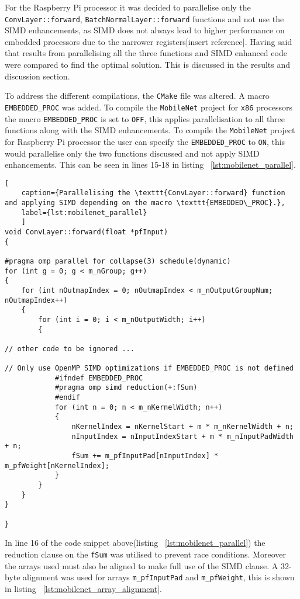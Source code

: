 For the Raspberry Pi processor it was decided to parallelise only the \texttt{ConvLayer::forward}, \texttt{BatchNormalLayer::forward} functions and not use the SIMD enhancements, as SIMD does not always lead to higher performance on embedded processors due to the narrower registers[insert reference]. Having said that results from parallelising all the three functions and SIMD enhanced code were compared to find the optimal solution. This is discussed in the results and discussion section. 

To address the different compilations, the \texttt{CMake} file was altered. A macro \texttt{EMBEDDED\_PROC} was added. To compile the \texttt{MobileNet} project for \texttt{x86} processors the macro \texttt{EMBEDDED\_PROC} is set to \texttt{OFF}, this applies parallelisation to all three functions along with the SIMD enhancements. To compile the \texttt{MobileNet} project for Raspberry Pi processor the user can specify the \texttt{EMBEDDED\_PROC} to \texttt{ON}, this would parallelise only the two functions discussed and not apply SIMD enhancements. This can be seen in lines 15-18 in listing ~\ref{lst:mobilenet_parallel}.

\begin{lstlisting}[
	caption={Parallelising the \texttt{ConvLayer::forward} function and applying SIMD depending on the macro \texttt{EMBEDDED\_PROC}.},
	label={lst:mobilenet_parallel}
	]
void ConvLayer::forward(float *pfInput)
{

#pragma omp parallel for collapse(3) schedule(dynamic)
for (int g = 0; g < m_nGroup; g++)
{
	for (int nOutmapIndex = 0; nOutmapIndex < m_nOutputGroupNum; nOutmapIndex++)
	{
		for (int i = 0; i < m_nOutputWidth; i++)
		{
			
// other code to be ignored ... 
			
// Only use OpenMP SIMD optimizations if EMBEDDED_PROC is not defined 
			#ifndef EMBEDDED_PROC
			#pragma omp simd reduction(+:fSum)
			#endif
			for (int n = 0; n < m_nKernelWidth; n++)
			{
				nKernelIndex = nKernelStart + m * m_nKernelWidth + n;
				nInputIndex = nInputIndexStart + m * m_nInputPadWidth + n;
				fSum += m_pfInputPad[nInputIndex] * m_pfWeight[nKernelIndex];
			}
		}
	}              
}

}
\end{lstlisting}

In line 16 of the code snippet above(listing ~\ref{lst:mobilenet_parallel}) the reduction clause on the \texttt{fSum} was utilised to prevent race conditions. Moreover the arrays used must also be aligned to make full use of the SIMD clause. A 32-byte alignment was used for arrays \texttt{m\_pfInputPad} and  \texttt{m\_pfWeight}, this is shown in listing  ~\ref{lst:mobilenet_array_alignment}.

